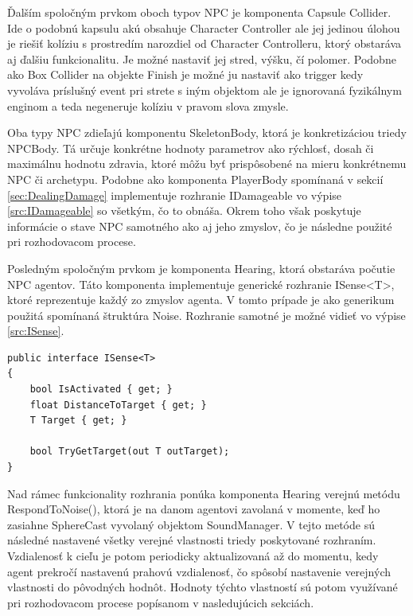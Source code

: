\documentclass[slovak, master]{diploma}
\begin{document}
Ďalším spoločným prvkom oboch typov NPC je komponenta Capsule Collider. Ide o podobnú kapsulu akú obsahuje Character Controller ale jej jedinou úlohou je riešiť kolíziu s prostredím narozdiel od Character Controlleru, ktorý obstaráva aj ďalšiu funkcionalitu. Je možné nastaviť jej stred, výšku, čí polomer. Podobne ako Box Collider na objekte Finish je možné ju nastaviť ako trigger kedy vyvoláva príslušný event pri strete s iným objektom ale je ignorovaná fyzikálnym enginom a teda negeneruje kolíziu v pravom slova zmysle.

Oba typy NPC zdieľajú komponentu SkeletonBody, ktorá je konkretizáciou triedy NPCBody. Tá určuje konkrétne hodnoty parametrov ako rýchlosť, dosah či maximálnu hodnotu zdravia, ktoré môžu byť prispôsobené na mieru konkrétnemu NPC či archetypu. Podobne ako komponenta PlayerBody spomínaná v sekcií \ref{sec:DealingDamage} implementuje rozhranie IDamageable vo výpise \ref{src:IDamageable} so všetkým, čo to obnáša. Okrem toho však poskytuje informácie o stave NPC samotného ako aj jeho zmyslov, čo je následne použité pri rozhodovacom procese.

Posledným spoločným prvkom je komponenta Hearing, ktorá obstaráva počutie NPC agentov. Táto komponenta implementuje generické rozhranie ISense<T>, ktoré reprezentuje každý zo zmyslov agenta. V tomto prípade je ako generikum použitá spomínaná štruktúra Noise. Rozhranie samotné je možné vidieť vo výpise \ref{src:ISense}.

\vspace{8pt}
\begin{lstlisting}[label=src:ISense,caption={Generické rozhranie ISense<T>}]
public interface ISense<T>
{
    bool IsActivated { get; }
    float DistanceToTarget { get; }
    T Target { get; }

    bool TryGetTarget(out T outTarget);
}
\end{lstlisting}

Nad rámec funkcionality rozhrania ponúka komponenta Hearing verejnú metódu RespondToNoise(), ktorá je na danom agentovi zavolaná v momente, keď ho zasiahne SphereCast vyvolaný objektom SoundManager. V tejto metóde sú následné nastavené všetky verejné vlastnosti triedy poskytované rozhraním. Vzdialenosť k cieľu je potom periodicky aktualizovaná až do momentu, kedy agent prekročí nastavenú prahovú vzdialenosť, čo spôsobí nastavenie verejných vlastnosti do pôvodných hodnôt. Hodnoty týchto vlastností sú potom využívané pri rozhodovacom procese popísanom v nasledujúcich sekciách.
\end{document}
